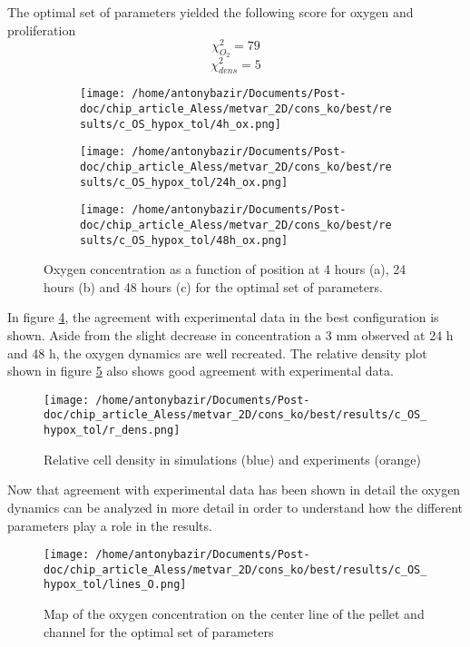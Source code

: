 \documentclass[11pt,a4paper]{article}
\begin{document}
The optimal set of parameters yielded the following score for oxygen and proliferation 
\[\chi^2_{O_2} = 79 \]
\[\chi^2_{dens} =  5\]


\begin{figure}[ht!]
\begin{subfigure}{0.33\textwidth}
	\centering
	\texttt{[image: /home/antonybazir/Documents/Post-doc/chip\_article\_Aless/metvar\_2D/cons\_ko/best/results/c\_OS\_hypox\_tol/4h\_ox.png]}
	\caption{ \label{4h_ox_best}}
\end{subfigure}
\begin{subfigure}{0.33\textwidth}
	\centering
	\texttt{[image: /home/antonybazir/Documents/Post-doc/chip\_article\_Aless/metvar\_2D/cons\_ko/best/results/c\_OS\_hypox\_tol/24h\_ox.png]}
	\caption{ \label{24h_ox_best}}
\end{subfigure}
\begin{subfigure}{0.33\textwidth}
	\centering
	\texttt{[image: /home/antonybazir/Documents/Post-doc/chip\_article\_Aless/metvar\_2D/cons\_ko/best/results/c\_OS\_hypox\_tol/48h\_ox.png]}
	\caption{ \label{48h_ox_best}}
\end{subfigure}
\caption{Oxygen concentration as a function of position at 4 hours (a), 24 hours (b) and 48 hours (c) for the optimal set of parameters.\label{Ox_best}}
\end{figure}

In figure \ref{Ox_best}, the agreement with experimental data in the best configuration is shown. Aside from the slight decrease in concentration a 3 mm observed at 24 h and 48 h, the oxygen dynamics are well recreated. The relative density plot shown in figure \ref{density_best} also shows good agreement with experimental data.

\begin{figure}[ht!]
\centering
\texttt{[image: /home/antonybazir/Documents/Post-doc/chip\_article\_Aless/metvar\_2D/cons\_ko/best/results/c\_OS\_hypox\_tol/r\_dens.png]}
\caption{Relative cell density in simulations (blue) and experiments (orange) \label{density_best}}
\end{figure}

Now that agreement with experimental data has been shown in detail the oxygen dynamics can be analyzed in more detail in order to understand how the different parameters play a role in the results.

\begin{figure}[ht!]
\centering
\texttt{[image: /home/antonybazir/Documents/Post-doc/chip\_article\_Aless/metvar\_2D/cons\_ko/best/results/c\_OS\_hypox\_tol/lines\_O.png]}
\caption{ Map of the oxygen concentration on the center line of the pellet and channel for the optimal set of parameters \label{best_map}}
\end{figure}
\end{document}
